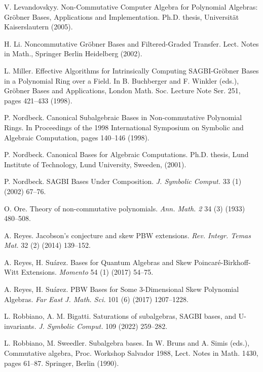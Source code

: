 \documentclass{amsart}
\theoremstyle{definition}
\theoremstyle{remark}
\numberwithin{equation}{section}
\begin{document}
\begin{thebibliography}{}
 V. Levandovskyy. Non-Commutative Computer Algebra for Polynomial Algebras: Gr\"obner Bases, Applications and Implementation. Ph.D. thesis, Universit\"at Kaiserslautern (2005).

 H. Li. Noncommutative {G}r\"obner {B}ases and {F}iltered-{G}raded {T}ransfer. Lect. Notes in Math., Springer Berlin Heidelberg (2002).

 L. Miller. Effective Algorithms for Intrinsically Computing SAGBI-Gr\"obner Bases in a Polynomial Ring over a Field. In B. Buchberger and F. Winkler (eds.), Gr\"obner Bases and Applications, London Math. Soc. Lecture Note Ser. 251, pages 421--433 (1998).

 P. Nordbeck. Canonical {S}ubalgebraic {B}ases in {N}on-commutative {P}olynomial {R}ings. In  Proceedings of the 1998 International Symposium on Symbolic and Algebraic Computation, pages 140--146  (1998).

 P. Nordbeck. Canonical {B}ases for {A}lgebraic {C}omputations. Ph.D. thesis, Lund Institute of Technology, Lund University, Sweeden, (2001).

P. Nordbeck. S{A}{G}{B}{I} {B}ases {U}nder {C}omposition. {\em J. Symbolic Comput.} 33 (1) (2002) 67--76.

 O. Ore. Theory of non-commutative polynomials. {\em Ann. Math. 2} 34 (3) (1933) 480--508. 

 A. Reyes. Jacobson's conjecture and skew PBW extensions. {\em Rev. Integr. Temas Mat.} 32 (2) (2014) 139--152.

 A. Reyes, H. Su\'arez. Bases for {Q}uantum {A}lgebras and {S}kew {P}oincar\'e-{B}irkhoff-{W}itt {E}xtensions. {\em Momento} 54 (1) (2017) 54--75.

 A. Reyes, H. Su{\'{a}}rez. PBW Bases for Some 3-Dimensional Skew Polynomial Algebras. {\em Far East J. Math. Sci.} 101 (6) (2017) 1207--1228.

 L. Robbiano, A. M. Bigatti. Saturations of subalgebras, {S}{A}{G}{B}{I} bases, and {U}-invariants. {\em J. Symbolic Comput.} 109 (2022) 259--282.

 L. Robbiano, M. Sweedler. Subalgebra bases. In W. Bruns and A. Simis (eds.), Commutative algebra, Proc. Workshop Salvador 1988, Lect. Notes in Math. 1430, pages 61--87. Springer, Berlin (1990).


\end{thebibliography}
\end{document}
